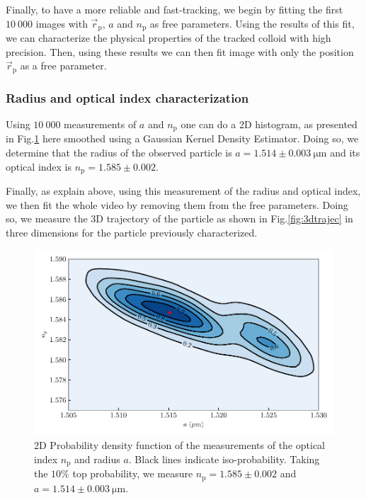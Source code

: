 Finally, to have a more reliable and fast-tracking, we begin by fitting the first $10~000$ images with  $\vec{r}_\mathrm{p}$, $a$ and $n_\mathrm{p}$ as free parameters. Using the results of this fit, we can characterize the physical properties of the tracked colloid with high precision. Then, using these results we can then fit image with only the position $\vec{r}_\mathrm{p} $ as a free parameter.




\subsubsection{Radius and optical index characterization}
\label{sec:radius_charac}

Using $10 ~ 000$ measurements of $a$ and $n_\mathrm{p}$ one can do a 2D histogram, as presented in Fig.\ref{fig:KDErn} here smoothed using a Gaussian Kernel Density Estimator. Doing so, we determine that the radius of the observed particle is $a=1.514 \pm 0.003 ~ \mathrm{\mu m} $ and its optical index is $n_\mathrm{p} = 1.585 \pm 0.002$.





Finally, as explain above, using this measurement of the radius and optical index, we then fit the whole video by removing them from the free parameters. Doing so, we measure the 3D trajectory of the particle as shown in Fig.\ref{fig:3dtrajec} in three dimensions for the particle previously characterized.

\begin{figure}[!ht]
	\centering
	\includegraphics{02_body/chapter2/images/r_n_measurements/KDErn.pdf}
	\caption{2D Probability density function of the measurements of the optical index $n_\mathrm{p}$ and radius $a$. Black lines indicate iso-probability. Taking the $10\% $ top probability, we measure $n_\mathrm{p} = 1.585 \pm 0.002$ and $a=1.514 \pm 0.003 ~ \mathrm{\mu m}$.~\href{https://github.com/eXpensia/Confined-Brownian-Motion/blob/main/02_body/chapter2/images/r_n_measurements/mesure\%20n\%20r.ipynb}{\faGithub} }
	\label{fig:KDErn}
\end{figure}

